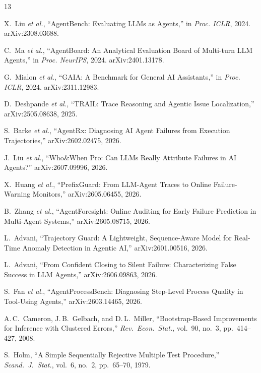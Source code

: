 \documentclass[conference,letterpaper]{IEEEtran}
\begin{document}
\begin{thebibliography}{13}

 X.~Liu \textit{et al.}, ``AgentBench: Evaluating LLMs as
Agents,'' in \textit{Proc. ICLR}, 2024. arXiv:2308.03688.

 C.~Ma \textit{et al.}, ``AgentBoard: An Analytical
Evaluation Board of Multi-turn LLM Agents,'' in \textit{Proc. NeurIPS},
2024. arXiv:2401.13178.

 G.~Mialon \textit{et al.}, ``GAIA: A Benchmark for General
AI Assistants,'' in \textit{Proc. ICLR}, 2024. arXiv:2311.12983.

 D.~Deshpande \textit{et al.}, ``TRAIL: Trace Reasoning and
Agentic Issue Localization,'' arXiv:2505.08638, 2025.

 S.~Barke \textit{et al.}, ``AgentRx: Diagnosing AI Agent
Failures from Execution Trajectories,'' arXiv:2602.02475, 2026.

 J.~Liu \textit{et al.}, ``Who\&When Pro: Can LLMs Really
Attribute Failures in AI Agents?'' arXiv:2607.09996, 2026.

 X.~Huang \textit{et al.}, ``PrefixGuard: From LLM-Agent
Traces to Online Failure-Warning Monitors,'' arXiv:2605.06455, 2026.

 B.~Zhang \textit{et al.}, ``AgentForesight: Online Auditing
for Early Failure Prediction in Multi-Agent Systems,''
arXiv:2605.08715, 2026.

 L.~Advani, ``Trajectory Guard: A Lightweight,
Sequence-Aware Model for Real-Time Anomaly Detection in Agentic AI,''
arXiv:2601.00516, 2026.

 L.~Advani, ``From Confident Closing to Silent Failure:
Characterizing False Success in LLM Agents,'' arXiv:2606.09863, 2026.

 S.~Fan \textit{et al.}, ``AgentProcessBench: Diagnosing
Step-Level Process Quality in Tool-Using Agents,'' arXiv:2603.14465,
2026.

 A.\,C.~Cameron, J.\,B.~Gelbach, and D.\,L.~Miller,
``Bootstrap-Based Improvements for Inference with Clustered Errors,''
\textit{Rev.\ Econ.\ Stat.}, vol.~90, no.~3, pp.~414--427, 2008.

 S.~Holm, ``A Simple Sequentially Rejective Multiple Test
Procedure,'' \textit{Scand.\ J.\ Stat.}, vol.~6, no.~2, pp.~65--70,
1979.

\end{thebibliography}
\end{document}
